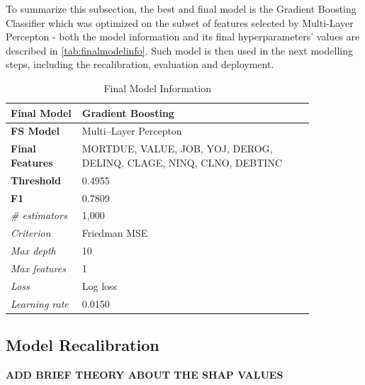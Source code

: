 To summarize this subsection, the best and final model is the Gradient Boosting Classifier which was optimized on the subset of features selected by Multi-Layer Percepton - both the model information and its final hyperparameters' values are described in \autoref{tab:finalmodelinfo}. Such model is then used in the next modelling steps, including the recalibration, evaluation and deployment.
\begin{table}[H]
    \small
    \setlength{\tabcolsep}{8pt}
    \renewcommand{\arraystretch}{1.3}
    \centering
    \caption{Final Model Information}\label{tab:finalmodelinfo}
    \begin{tabular}{>{\raggedleft\arraybackslash}p{0.20\linewidth}|p{0.65\linewidth}}
    \toprule
    \midrule
    \textbf{Final Model} & Gradient Boosting \\
    \midrule
    \textbf{FS Model} & Multi--Layer Percepton \\
    \midrule
    \textbf{Final Features} &
    MORTDUE, VALUE, JOB, YOJ, DEROG, DELINQ, CLAGE, NINQ, CLNO, DEBTINC \\
    \midrule
    \textbf{Threshold} & 0.4955 \\
    \midrule
    \textbf{F1} & 0.7809 \\
    \midrule
    \textit{\# estimators} & 1,000 \\
    \midrule
    \textit{Criterion} & Friedman MSE \\
    \midrule
    \textit{Max depth} & 10 \\
    \midrule
    \textit{Max features} & 1 \\
    \midrule
    \textit{Loss} & Log loss \\
    \midrule
    \textit{Learning rate} & 0.0150 \\
    \midrule
    \bottomrule
    \end{tabular}
    \vspace{0.5em}
    
    \vspace{-0.5em}
\end{table}

\newpage
\subsection{Model Recalibration}

\textbf{ADD BRIEF THEORY ABOUT THE SHAP VALUES}

